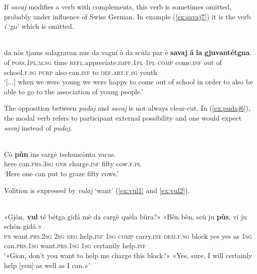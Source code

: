 If \textit{savaj} modifies a verb with complements, this verb is sometimes omitted, probably under influence of Swiss German. In example (\ref{ex:savaj7}) it is the verb \textit{í} `go' which is omitted.

\ea
\label{ex:savaj7}
\\
	\gll [...] da nòs tjams salagravan nus da vagní ò da scùla par è \textbf{savaj} {\longrule} \textbf{á} \textbf{la} \textbf{gjuvantétgna}.\\
 {} of \textsc{ poss.1pl.m.sg} time \textsc{refl}.appreciate.\textsc{impf.1pl} \textsc{1pl} \textsc{comp} come.\textsc{inf} out of school.\textsc{f.sg} \textsc{purp} also can.\textsc{inf} {} to \textsc{def.art.f.sg} youth\\
\glt `[...] when we were young we were happy to come out of school in order to also be able to go to the association of young people.'
\z

The opposition between \textit{pudaj} and \textit{savaj} is not always clear-cut. In (\ref{ex:pudaj6}), the modal verb refers to participant external possibility and one would expect \textit{savaj} instead of \textit{pudaj}.

\ea
\label{ex:pudaj6}
\\
\gll   Cò \textbf{pùn} ins cargè tschuncònta vacas.\\
here can.\textsc{prs.3sg} \textsc{gnr} charge.\textsc{inf} fifty cow.\textsc{f.pl}\\
\glt `Here one can put to graze fifty cows.'
\z
                               
Volition is expressed by \textit{vulaj} `want' (\ref{ex:vul1} and \ref{ex:vul2}). 

\ea
\label{ex:vul1}
\\
\gll    «Gjòn, \textbf{vul}\footnotemark{} té bétga gidá mè da cargè quèla bùra?» «Bèn bèn, scù ju \textbf{pùs}, vi ju schòn gidá.»\\
\textsc{pn} want.\textsc{prs.2sg} \textsc{2sg} \textsc{neg} help.\textsc{inf} \textsc{1sg} \textsc{comp} carry.\textsc{inf} \textsc{dem.f.sg} block yes yes as \textsc{1sg} can.\textsc{prs.1sg} want.\textsc{prs.1sg} \textsc{1sg} certanily help.\textsc{inf}\\ 
\glt `«Gion, don’t you want to help me charge this block?» «Yes, sure, I will certainly help [you] as well as I can.»'
\z

